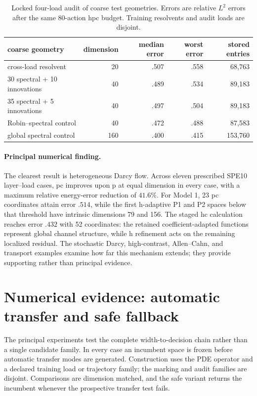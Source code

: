 \documentclass[11pt]{article}
\numberwithin{algorithm}{section}
\theoremstyle{definition}\newtheorem{definition}[theorem]{Definition}
\theoremstyle{remark}\newtheorem{remark}[theorem]{Remark}
\begin{document}
\begin{table}[t]
\centering
\caption{Locked four-load audit of coarse test geometries.  Errors are relative
$L^2$ errors after the same 80-action hpc budget.  Training resolvents and audit
loads are disjoint.}
\label{tab:crossload-coarse}
\begin{tabular}{lrrrr}
\toprule
coarse geometry & dimension & median error & worst error & stored entries\\
\midrule
cross-load resolvent & 20 & .507 & .558 & 68,763\\
30 spectral + 10 innovations & 40 & .489 & .534 & 89,183\\
35 spectral + 5 innovations & 40 & .497 & .504 & 89,183\\
Robin--spectral control & 40 & .472 & .488 & 87,583\\
global spectral control & 160 & .400 & .415 & 153,760\\
\bottomrule
\end{tabular}
\end{table}

\paragraph{Principal numerical finding.}
The clearest result is heterogeneous Darcy flow.  Across eleven prescribed
SPE10 layer--load cases, pc improves upon p at equal dimension in every case,
with a maximum relative energy-error reduction of $41.6\%$.  For Model 1,
23 pc coordinates attain error $.514$, while the first h-adaptive P1 and P2
spaces below that threshold have intrinsic dimensions 79 and 156.  The staged
hc calculation reaches error $.432$ with 52 coordinates: the retained
coefficient-adapted functions represent global channel structure, while h
refinement acts on the remaining localized residual.  The stochastic Darcy,
high-contrast, Allen--Cahn, and transport examples examine how far this
mechanism extends; they provide supporting rather than principal evidence.

\endsecondarynumericsD

\section{Numerical evidence: automatic transfer and safe fallback}
\label{sec:main-numerics}
The principal experiments test the complete width-to-decision chain rather
than a single candidate family.  In every case an incumbent space is frozen
before automatic transfer modes are generated.  Construction uses the PDE
operator and a declared training load or trajectory family; the marking and
audit families are disjoint.  Comparisons are dimension matched, and the safe
variant returns the incumbent whenever the prospective transfer test fails.
\end{document}
